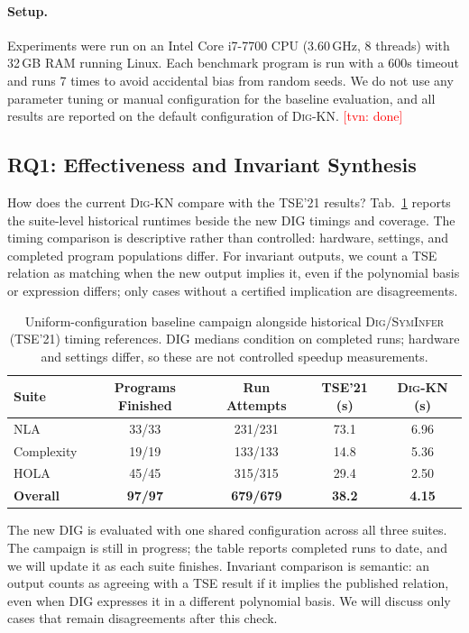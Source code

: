 \documentclass[runningheads]{llncs}
\newcommand{\tool}{\textsc{Dig-KN}\xspace}
\newcommand{\tvn}[1]{\textcolor{red}{[tvn: #1]}}
\begin{document}
\paragraph{Setup.}  Experiments were run on an Intel Core i7-7700
CPU (3.60\,GHz, 8 threads) with 32\,GB RAM running Linux.
Each benchmark program is run with a 600s timeout and runs 7 times to avoid accidental bias from random seeds.
We do not use any parameter tuning or manual configuration for the baseline evaluation, and all results are reported on the default configuration of \tool{}.
\tvn{done}


\subsection{RQ1: Effectiveness and Invariant Synthesis}
\label{sec:rq1}

How does the current \tool{} compare with the TSE'21 results?  Tab.~\ref{tab:comparison} reports the suite-level historical runtimes beside the new DIG timings and coverage. The timing comparison is descriptive rather than controlled: hardware, settings, and completed program populations differ. For invariant outputs, we count a TSE relation as matching when the new output implies it, even if the polynomial basis or expression differs; only cases without a certified implication are disagreements.

\begin{table}[t]
\centering
\caption{Uniform-configuration baseline campaign alongside historical \textsc{Dig/SymInfer} (TSE'21) timing references. DIG medians condition on completed runs; hardware and settings differ, so these are not controlled speedup measurements.}
\label{tab:comparison}
\begin{tabular}{lcccc}
\toprule
Suite & Programs Finished & Run Attempts & TSE'21 (s) & \tool{} (s) \\
\midrule
NLA & 33/33 & 231/231 & 73.1 & 6.96 \\
Complexity & 19/19 & 133/133 & 14.8 & 5.36 \\
HOLA & 45/45 & 315/315 & 29.4 & 2.50 \\
\textbf{Overall} & \textbf{97/97} & \textbf{679/679} & \textbf{38.2} & \textbf{4.15} \\
\bottomrule
\end{tabular}
\end{table}

The new DIG is evaluated with one shared configuration across all three suites. The campaign is still in progress; the table reports completed runs to date, and we will update it as each suite finishes. Invariant comparison is semantic: an output counts as agreeing with a TSE result if it implies the published relation, even when DIG expresses it in a different polynomial basis. We will discuss only cases that remain disagreements after this check.
\end{document}
